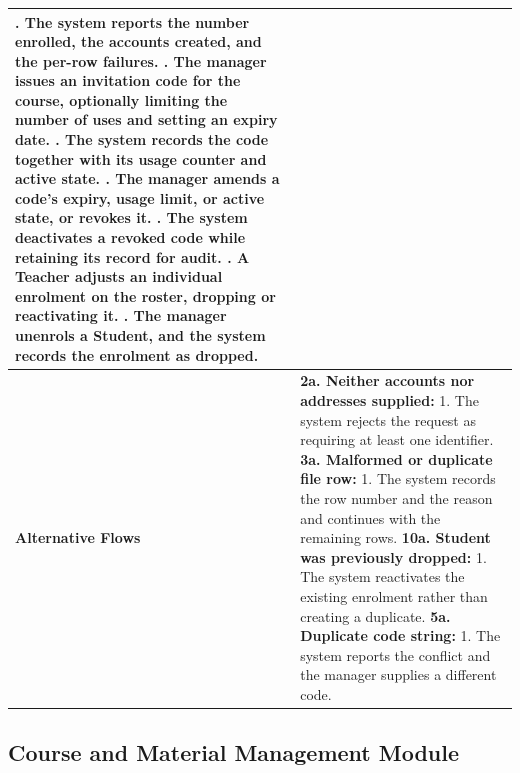 \begin{longtable}{|>{\raggedright\arraybackslash}p{}|>{\raggedright\arraybackslash}p{}|}
4. The system reports the number enrolled, the accounts created, and the per-row failures. \newline
5. The manager issues an invitation code for the course, optionally limiting the number of uses and setting an expiry date. \newline
6. The system records the code together with its usage counter and active state. \newline
7. The manager amends a code's expiry, usage limit, or active state, or revokes it. \newline
8. The system deactivates a revoked code while retaining its record for audit. \newline
9. A Teacher adjusts an individual enrolment on the roster, dropping or reactivating it. \newline
10. The manager unenrols a Student, and the system records the enrolment as dropped. \\ \hline
\textbf{Alternative Flows} &
\textbf{2a. Neither accounts nor addresses supplied:} \newline
\hspace*{1em}1. The system rejects the request as requiring at least one identifier. \newline
\textbf{3a. Malformed or duplicate file row:} \newline
\hspace*{1em}1. The system records the row number and the reason and continues with the remaining rows. \newline
\textbf{10a. Student was previously dropped:} \newline
\hspace*{1em}1. The system reactivates the existing enrolment rather than creating a duplicate. \newline
\textbf{5a. Duplicate code string:} \newline
\hspace*{1em}1. The system reports the conflict and the manager supplies a different code. \\
\end{longtable}

\subsection{Course and Material Management Module}

